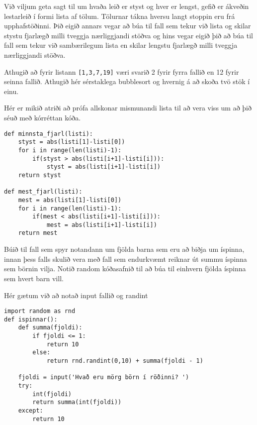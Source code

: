 \begin{exercise}\label{rei2}
Við viljum geta sagt til um hvaða leið er styst og hver er lengst, gefið er ákveðin lestarleið í formi lista af tölum.
Tölurnar tákna hversu langt stoppin eru frá upphafstöðinni.
Þið eigið annars vegar að búa til fall sem tekur við lista og skilar stystu fjarlægð milli tveggja nærliggjandi stöðva og hins vegar eigið þið að búa til fall sem tekur við sambærilegum lista en skilar lengstu fjarlægð milli tveggja nærliggjandi stöðva.

Athugið að fyrir listann \texttt{[1,3,7,19]} væri svarið 2 fyrir fyrra fallið en 12 fyrir seinna fallið.
Athugið hér sérstaklega bubblesort og hvernig á að skoða tvö stök í einu.
\end{exercise}
\begin{Answer}[ref={rei2}]
Hér er mikið atriði að prófa allskonar mismunandi lista til að vera viss um að þið séuð með kórréttan kóða.
	\begin{lstlisting}
def minnsta_fjarl(listi):
	styst = abs(listi[1]-listi[0])
	for i in range(len(listi)-1):
		if(styst > abs(listi[i+1]-listi[i])):
			styst = abs(listi[i+1]-listi[i])
	return styst

def mest_fjarl(listi):
	mest = abs(listi[1]-listi[0])
	for i in range(len(listi)-1):
		if(mest < abs(listi[i+1]-listi[i])):
			mest = abs(listi[i+1]-listi[i])
	return mest

\end{lstlisting}
\end{Answer}

\begin{exercise}\label{rei2}
Búið til fall sem spyr notandann um fjölda barna sem eru að biðja um íspinna, innan þess falls skulið vera með fall sem endurkvæmt reiknar út summu íspinna sem börnin vilja.
Notið random kóðasafnið til að búa til einhvern fjölda íspinna sem hvert barn vill.
\end{exercise}
\begin{Answer}[ref={rei2}]
Hér gætum við að notað input fallið og randint
	\begin{lstlisting}
import random as rnd
def ispinnar():
	def summa(fjoldi):
		if fjoldi <= 1:
			return 10
		else:
			return rnd.randint(0,10) + summa(fjoldi - 1)

	fjoldi = input('Hvað eru mörg börn í röðinni? ')
	try:
		int(fjoldi)
		return summa(int(fjoldi))
	except:
		return 10
	\end{lstlisting}
\end{Answer}